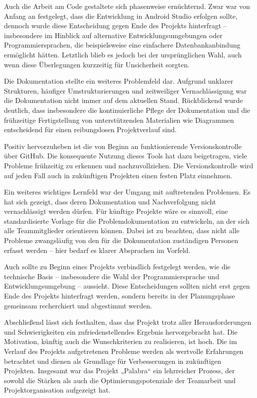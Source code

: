 \documentclass[12pt,a4paper]{article}
\begin{document}
Auch die Arbeit am Code gestaltete sich phasenweise ernüchternd. Zwar war von Anfang an festgelegt, dass die Entwicklung in Android Studio erfolgen sollte, dennoch wurde diese Entscheidung gegen Ende des Projekts hinterfragt – insbesondere im Hinblick auf alternative Entwicklungsumgebungen oder Programmiersprachen, die beispielsweise eine einfachere Datenbankanbindung ermöglicht hätten. Letztlich blieb es jedoch bei der ursprünglichen Wahl, auch wenn diese Überlegungen kurzzeitig für Unsicherheit sorgten.

Die Dokumentation stellte ein weiteres Problemfeld dar. Aufgrund unklarer Strukturen, häufiger Umstrukturierungen und zeitweiliger Vernachlässigung war die Dokumentation nicht immer auf dem aktuellen Stand. Rückblickend wurde deutlich, dass insbesondere die kontinuierliche Pflege der Dokumentation und die frühzeitige Fertigstellung von unterstützenden Materialien wie Diagrammen entscheidend für einen reibungslosen Projektverlauf sind.

Positiv hervorzuheben ist die von Beginn an funktionierende Versionskontrolle über GitHub. Die konsequente Nutzung dieses Tools hat dazu beigetragen, viele Probleme frühzeitig zu erkennen und nachzuvollziehen. Die Versionskontrolle wird auf jeden Fall auch in zukünftigen Projekten einen festen Platz einnehmen.

Ein weiteres wichtiges Lernfeld war der Umgang mit auftretenden Problemen. Es hat sich gezeigt, dass deren Dokumentation und Nachverfolgung nicht vernachlässigt werden dürfen. Für künftige Projekte wäre es sinnvoll, eine standardisierte Vorlage für die Problemdokumentation zu entwickeln, an der sich alle Teammitglieder orientieren können. Dabei ist zu beachten, dass nicht alle Probleme zwangsläufig von den für die Dokumentation zuständigen Personen erfasst werden – hier bedarf es klarer Absprachen im Vorfeld.

Auch sollte zu Beginn eines Projekts verbindlich festgelegt werden, wie die technische Basis – insbesondere die Wahl der Programmiersprache und Entwicklungsumgebung – aussieht. Diese Entscheidungen sollten nicht erst gegen Ende des Projekts hinterfragt werden, sondern bereits in der Planungsphase gemeinsam recherchiert und abgestimmt werden.

Abschließend lässt sich festhalten, dass das Projekt trotz aller Herausforderungen und Schwierigkeiten ein zufriedenstellendes Ergebnis hervorgebracht hat. Die Motivation, künftig auch die Wunschkriterien zu realisieren, ist hoch. Die im Verlauf des Projekts aufgetretenen Probleme werden als wertvolle Erfahrungen betrachtet und dienen als Grundlage für Verbesserungen in zukünftigen Projekten. Insgesamt war das Projekt „Palabra“ ein lehrreicher Prozess, der sowohl die Stärken als auch die Optimierungspotenziale der Teamarbeit und Projektorganisation aufgezeigt hat.
\end{document}
